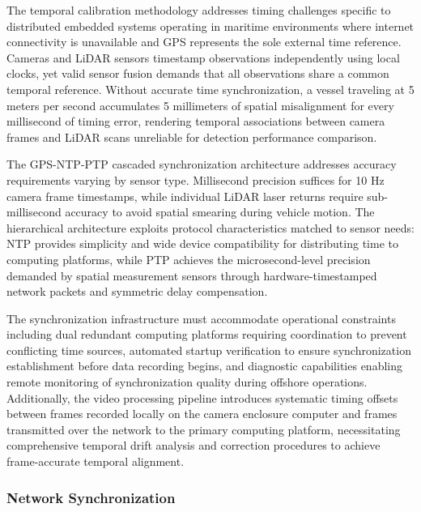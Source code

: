 \documentclass{erauthesis}
\begin{document}
The temporal calibration methodology addresses timing challenges specific to distributed embedded systems operating in maritime environments where internet connectivity is unavailable and GPS represents the sole external time reference.
Cameras and LiDAR sensors timestamp observations independently using local clocks, yet valid sensor fusion demands that all observations share a common temporal reference.
Without accurate time synchronization, a vessel traveling at 5 meters per second accumulates 5 millimeters of spatial misalignment for every millisecond of timing error, rendering temporal associations between camera frames and LiDAR scans unreliable for detection performance comparison.

The GPS-NTP-PTP cascaded synchronization architecture addresses accuracy requirements varying by sensor type.
Millisecond precision suffices for 10 Hz camera frame timestamps, while individual LiDAR laser returns require sub-millisecond accuracy to avoid spatial smearing during vehicle motion.
The hierarchical architecture exploits protocol characteristics matched to sensor needs: NTP provides simplicity and wide device compatibility for distributing time to computing platforms, while PTP achieves the microsecond-level precision demanded by spatial measurement sensors through hardware-timestamped network packets and symmetric delay compensation.

The synchronization infrastructure must accommodate operational constraints including dual redundant computing platforms requiring coordination to prevent conflicting time sources, automated startup verification to ensure synchronization establishment before data recording begins, and diagnostic capabilities enabling remote monitoring of synchronization quality during offshore operations.
Additionally, the video processing pipeline introduces systematic timing offsets between frames recorded locally on the camera enclosure computer and frames transmitted over the network to the primary computing platform, necessitating comprehensive temporal drift analysis and correction procedures to achieve frame-accurate temporal alignment.

\subsubsection{Network Synchronization} \label{time_sync_lan}

\end{document}
